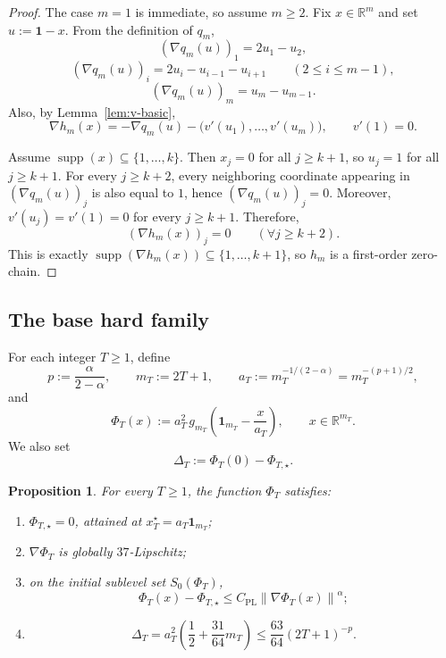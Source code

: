 \documentclass[11pt]{article}
\newtheorem{proposition}[theorem]{Proposition}
\newcommand{\R}{\mathbb{R}}
\newcommand{\norm}[1]{\left\lVert #1\right\rVert}
\newcommand{\supp}{\operatorname{supp}}
\newcommand{\one}{\mathbf{1}}
\begin{document}
	\begin{proof}
The case \(m=1\) is immediate, so assume \(m\ge2\).
	Fix $x\in\R^m$ and set $u:=\one-x$.
From the definition of \(q_m\),
	\[
	(\nabla q_m(u))_1=2u_1-u_2,
\]
\[
(\nabla q_m(u))_i=2u_i-u_{i-1}-u_{i+1}
\qquad (2\le i\le m-1),
\]
\[
(\nabla q_m(u))_m=u_m-u_{m-1}.
\]
Also, by Lemma~\ref{lem:v-basic},
\[
\nabla h_m(x)=-\nabla q_m(u)-\bigl(v'(u_1),\ldots,v'(u_m)\bigr),
\qquad
v'(1)=0.
\]

Assume $\supp(x)\subseteq \{1,\ldots,k\}$. Then $x_j=0$ for all $j\ge k+1$, so $u_j=1$ for all $j\ge k+1$.
For every $j\ge k+2$, every neighboring coordinate appearing in $(\nabla q_m(u))_j$ is also equal to $1$, hence $(\nabla q_m(u))_j=0$.
Moreover, $v'(u_j)=v'(1)=0$ for every $j\ge k+1$.
Therefore,
	\[
	(\nabla h_m(x))_j=0
	\qquad (\forall j\ge k+2).
	\]
This is exactly \(\supp(\nabla h_m(x))\subseteq\{1,\ldots,k+1\}\), so \(h_m\) is a first-order zero-chain.
	\end{proof}

\subsection{The base hard family}
\label{app:det-base-family}

For each integer $T\ge 1$, define
\[
p:=\frac{\alpha}{2-\alpha},
\qquad
m_T:=2T+1,
\qquad
a_T:=m_T^{-1/(2-\alpha)}=m_T^{-(p+1)/2},
\]
and
\[
\Phi_T(x):=a_T^2\,g_{m_T}\!\left(\one_{m_T}-\frac{x}{a_T}\right),
\qquad
x\in\R^{m_T}.
\]
We also set
\[
\Delta_T:=\Phi_T(0)-\Phi_{T,\star}.
\]

\begin{proposition}
\label{prop:base-instance}
For every $T\ge 1$, the function $\Phi_T$ satisfies:
\begin{enumerate}[label=(\roman*),leftmargin=1.5em]
    \item $\Phi_{T,\star}=0$, attained at $x_T^\star=a_T\one_{m_T}$;
    \item $\nabla \Phi_T$ is globally $37$-Lipschitz;
    \item on the initial sublevel set $S_0(\Phi_T)$,
    \[
    \Phi_T(x)-\Phi_{T,\star}\le C_{\mathrm{PL}}\norm{\nabla \Phi_T(x)}^\alpha;
    \]
    \item
    \[
    \Delta_T
    =
    a_T^2\left(\frac12+\frac{31}{64}m_T\right)
    \le
    \frac{63}{64}(2T+1)^{-p}.
    \]
\end{enumerate}
\end{proposition}
\end{document}
